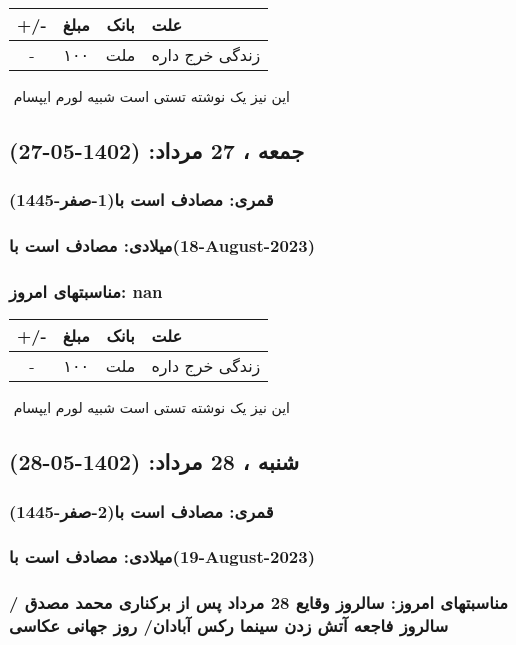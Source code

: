 \documentclass{article}
\newcommand{\rnote}[1]{\marginpar{\textcolor{color}{\StrSubstitute{\##1}{ }{\_}}}}
\newcommand{\myRow}[4]{
    #1 & #2 & #3 & #4 \\ \hline
}
\begin{document}
\begin{tabular}{ | c | c | c | p{5cm} |}
    \hline
    \myRow{ +/- }{مبلغ}{بانک}{علت}
    \myRow{-}{۱۰۰}{ملت}{زندگی خرج داره}
\end{tabular}
\newline
\newline

‌
\rnote{تست}
این نیز یک نوشته تستی است شبیه لورم ایپسام




\newpage
{}
\textcolor{color}{
\section{ جمعه ، 27 مرداد: (1402-05-27) }
\subsubsection*{قمری: مصادف است با(1-صفر-1445)} 
\subsubsection*{میلادی: مصادف است با(18-August-2023)}
\subsubsection*{مناسبتهای امروز: nan}
}


\begin{tabular}{ | c | c | c | p{5cm} |}
    \hline
    \myRow{ +/- }{مبلغ}{بانک}{علت}
    \myRow{-}{۱۰۰}{ملت}{زندگی خرج داره}
\end{tabular}
\newline
\newline

‌
\rnote{تست}
این نیز یک نوشته تستی است شبیه لورم ایپسام




\newpage
{}
\textcolor{color}{
\section{ شنبه ، 28 مرداد: (1402-05-28) }
\subsubsection*{قمری: مصادف است با(2-صفر-1445)} 
\subsubsection*{میلادی: مصادف است با(19-August-2023)}
\subsubsection*{مناسبتهای امروز: سالروز وقایع 28 مرداد پس از برکناری محمد مصدق / سالروز فاجعه آتش زدن سینما رکس آبادان/ روز جهانی عکاسی}
}
\end{document}
